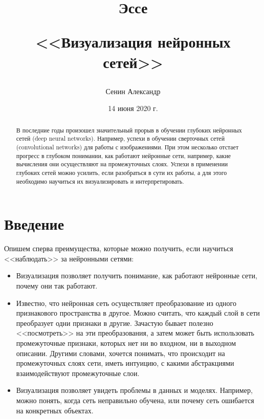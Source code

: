 \documentclass[12pt,fleqn]{article}
\title{Эссе

<<Визуализация нейронных сетей>>}
\author{Сенин Александр}
\date{14 июня 2020 г.}
\begin{document}
\maketitle

\begin{abstract}
В последние годы произошел значительный прорыв в обучении глубоких нейронных сетей (deep neural networks). Например, успехи в обучении сверточных сетей (convolutional networks) для работы с изображениями. При этом несколько отстает прогресс в глубоком понимании, как работают нейронные сети, например, какие вычисления они осуществляют на промежуточных слоях. Успехи в применении глубоких сетей можно усилить, если разобраться в сути их работы, а для этого необходимо научиться их визуализировать и интерпретировать.
    
\end{abstract}

\section{Введение}
Опишем сперва преимущества, которые можно получить, если научиться <<наблюдать>> за нейронными сетями:
\begin{itemize}
\item Визуализация позволяет получить понимание, как работают нейронные сети, почему они так работают.
\item Известно, что нейронная сеть осуществляет преобразование из одного признакового пространства в другое. Можно считать, что каждый слой в сети преобразует одни признаки в другие. Зачастую бывает полезно <<посмотреть>> на эти преобразования, а затем может быть использовать промежуточные признаки, которых нет ни во входном, ни в выходном описании. Другими словами, хочется понимать, что происходит на промежуточных слоях сети, иметь интуицию, с какими абстракциями взаимодействуют промежуточные слои.
\item Визуализация позволяет увидеть проблемы в данных и моделях. Например, можно понять, когда сеть неправильно обучена, или почему сеть ошибается на конкретных объектах.
\end{itemize}
\end{document}
